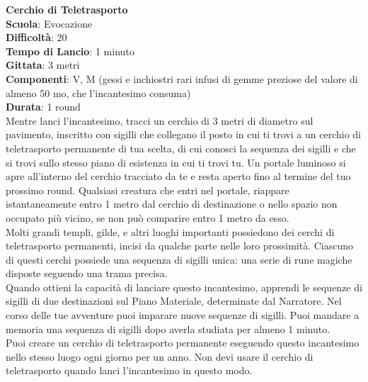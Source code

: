 \begin{multicols}{2}
\medskip\textbf{Cerchio di Teletrasporto}\\
\textbf{Scuola}: Evocazione\\
\textbf{Difficoltà}: 20\\
\textbf{Tempo di Lancio}: 1 minuto\\
\textbf{Gittata}: 3 metri\\
\textbf{Componenti}: V, M (gessi e inchiostri rari infusi di gemme preziose del valore di almeno 50 mo, che l'incantesimo consuma)\\
\textbf{Durata}: 1 round\\
Mentre lanci l'incantesimo, tracci un cerchio di 3 metri di diametro sul pavimento, inscritto con sigilli che collegano il posto in cui ti trovi a un cerchio di teletrasporto permanente di tua scelta, di cui conosci la sequenza dei sigilli e che si trovi sullo stesso piano di esistenza in cui ti trovi tu. Un portale luminoso si apre all'interno del cerchio tracciato da te e resta aperto fino al termine del tuo prossimo round. Qualsiasi creatura che entri nel portale, riappare istantaneamente entro 1 metro dal cerchio di destinazione o nello spazio non
occupato più vicino, se non può comparire entro 1 metro da esso.\\
Molti grandi templi, gilde, e altri luoghi importanti possiedono dei cerchi di teletrasporto permanenti, incisi da qualche parte nelle loro prossimità. Ciascuno di questi cerchi possiede una sequenza di sigilli unica: una serie di rune magiche disposte seguendo una trama precisa.\\ Quando ottieni la capacità di lanciare questo incantesimo, apprendi le sequenze di sigilli di
due destinazioni sul Piano Materiale, determinate dal Narratore. Nel corso delle tue avventure puoi imparare nuove sequenze di sigilli. Puoi mandare a memoria una sequenza di sigilli dopo averla studiata per almeno 1 minuto.\\
Puoi creare un cerchio di teletrasporto permanente eseguendo questo incantesimo nello stesso luogo ogni giorno per un anno. Non devi usare il cerchio di teletrasporto quando lanci l'incantesimo in questo modo.


\end{multicols}
